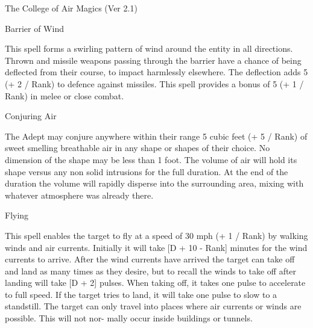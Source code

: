 \begin{Chapter}{The College of Air Magics (Ver 2.1)}
\begin{spell}[S-4]{Barrier of Wind}

\begin{effects}
This spell forms a swirling pattern of wind around the entity in all
directions.  Thrown and missile weapons passing through the barrier
have a chance of being deflected from their course, to impact
harmlessly elsewhere.  The deflection adds 5 (+ 2 / Rank) to defence
against missiles.  This spell provides a bonus of 5 (+ 1 / Rank) in
melee or close combat.
\end{effects}
\end{spell}

\begin{spell}[S-5]{Conjuring Air}

\begin{effects}
The Adept may conjure anywhere within their range 5 cubic feet (+ 5 /
Rank) of sweet smelling breathable air in any shape or shapes of their
choice.  No dimension of the shape may be less than 1 foot.  The
volume of air will hold its shape versus any non solid intrusions for
the full duration. At the end of the duration the volume will rapidly
disperse into the surrounding area, mixing with whatever atmosphere
was already there.
\end{effects}
\end{spell}

\begin{spell}[S-6]{Flying}

\begin{effects}
This spell enables the target to fly at a speed of 30 mph (+ 1 / Rank)
by walking winds and air currents.  Initially it will take [D + 10 -
  Rank] minutes for the wind currents to arrive.  After the wind
currents have arrived the target can take off and land as many times
as they desire, but to recall the winds to take off after landing will
take [D + 2] pulses.  When taking off, it takes one pulse to
accelerate to full speed.  If the target tries to land, it will take
one pulse to slow to a standstill.  The target can only travel into
places where air currents or winds are possible.  This will not nor-
mally occur inside buildings or tunnels.
\end{effects}
\end{spell}


\end{Chapter}
